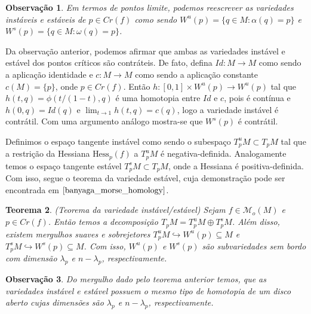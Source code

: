 \documentclass[12pt]{book}
\newtheorem{teorema}{Teorema}[section]
\newtheorem{observacao}[teorema]{Observação}
\newcommand{\espacotangentevariedadeestavel}{T^{s}_{p}M}
\newcommand{\espacotangentevariedadeinstavel}{T^{u}_{p}M}
\newcommand{\espacotangenteponto}[2]{T_{#1}#2}
\newcommand{\espacotangentevariedade}{\espacotangenteponto{p}{M}}
\newcommand{\funcoesmorse}[1]{\mathcal{M}_{o}(#1)}
\newcommand{\hessianaponto}[2]{\text{Hess}_{#1}(#2)}
\newcommand{\intervalo}{[0,1]}
\newcommand{\pontoscriticos}[1]{\textit{Cr}(#1)}
\newcommand{\variedadeestavel}[1]{W^{s}(#1)}
\newcommand{\variedadeinstavel}[1]{W^{u}(#1)}
\begin{document}
	\begin{observacao}
		Em termos de pontos limite, podemos reescrever as variedades instáveis e estáveis de $p \in \pontoscriticos{f}$ como sendo $\variedadeinstavel{p} = \{q\in M: \alpha(q)=p\}$ e $\variedadeestavel{p} = \{q\in M: \omega(q)=p\}$.
	\end{observacao}
	
	Da observação anterior, podemos afirmar que ambas as variedades instável e estável dos pontos críticos são contráteis. De fato, defina $Id: M\to M$ como sendo a aplicação identidade e $c:M\to M$ como sendo a aplicação constante $c(M) =\{p\} $, onde $p \in \pontoscriticos{f}$. Então $h:\intervalo\times \variedadeinstavel{p} \to \variedadeinstavel{p}$ tal que $h(t,q) = \phi(t/(1-t), q)$ é uma homotopia entre $Id$ e $c$, pois é contínua e $h(0, q) = Id(q)$ e $\lim_{t \to 1}h(t, q) = c(q)$, logo a variedade instável é contrátil. Com uma argumento análogo mostra-se que $\variedadeestavel{p}$ é contrátil.
	
	Definimos o espaço tangente instável como sendo o subespaço $\espacotangentevariedadeinstavel\subset \espacotangentevariedade$ tal que a restrição da Hessiana $\hessianaponto{p}{f}$ a $\espacotangentevariedadeinstavel$ é negativa-definida. Analogamente temos o espaço tangente estável $\espacotangentevariedadeestavel \subset \espacotangentevariedade$, onde a Hessiana é positiva-definida. Com isso, segue o teorema da variedade estável, cuja demonstração pode ser encontrada em $\cite{banyaga_morse_homology}$.
	
	\begin{teorema}\label{teorema_variedade_instavel_estavel}
		(Teorema da variedade instável/estável) Sejam $f \in \funcoesmorse{M}$ e $p \in \pontoscriticos{f}$. Então temos a decomposição $\espacotangentevariedade=\espacotangentevariedadeinstavel\oplus\espacotangentevariedadeestavel$. Além disso, existem mergulhos suaves e sobrejetores $\espacotangentevariedadeinstavel \hookrightarrow \variedadeinstavel{p} \subseteq M$ e $\espacotangentevariedadeestavel \hookrightarrow \variedadeestavel{p} \subseteq M$. Com isso, $\variedadeinstavel{p}$ e $\variedadeestavel{p}$ são subvariedades sem bordo com dimensão $\lambda_{p}$ e $n-\lambda_{p}$, respectivamente.
	\end{teorema}
	
	\begin{observacao}
		Do mergulho dado pelo teorema anterior temos, que as variedades instável e estável possuem o mesmo tipo de homotopia de um disco aberto cujas dimensões são $\lambda_{p}$ e $n-\lambda_{p}$, respectivamente.
	\end{observacao}
\end{document}
